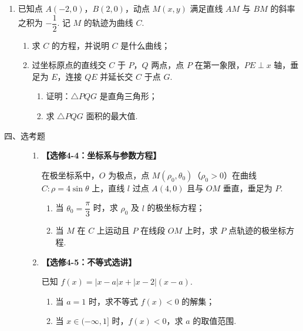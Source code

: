 \begin{description}
\begin{enumerate}[leftmargin=5pt]
        \item 已知点 \(A(-2,0)\)，\(B(2,0)\)，动点 \(M(x,y)\) 满足直线 \(AM\) 与 \(BM\) 的斜率之积为 \(-\dfrac12\). 记 \(M\) 的轨迹为曲线 \(C\).

\begin{enumerate}
\item 求 \(C\) 的方程，并说明 \(C\) 是什么曲线；
\item 过坐标原点的直线交 \(C\) 于 \(P\)，\(Q\) 两点，点 \(P\) 在第一象限，\(PE\perp x\) 轴，垂足为 \(E\)，连接 \(QE\) 并延长交 \(C\) 于点 \(G\).
\begin{enumerate}
\item 证明：\(\triangle PQG\) 是直角三角形；
\item 求 \(\triangle PQG\) 面积的最大值.
\end{enumerate}
\end{enumerate}

    \end{enumerate}

\end{description}

\begin{description}

    \item[四、选考题]

    \begin{enumerate}[leftmargin=5pt]

      \addtocounter{enumi}{+21}

        \item \textbf{【选修4-4：坐标系与参数方程】}

在极坐标系中，\(O\) 为极点，点 \(M(\rho_0,\theta_0)\)（\(\rho_0>0\)）在曲线 \(C:\rho=4\sin\theta\) 上，直线 \(l\) 过点 \(A(4,0)\) 且与 \(OM\) 垂直，垂足为 \(P\).

\begin{enumerate}
\item 当 \(\theta_0=\dfrac{\pi}{3}\) 时，求 \(\rho_0\) 及 \(l\) 的极坐标方程；
\item 当 \(M\) 在 \(C\) 上运动且 \(P\) 在线段 \(OM\) 上时，求 \(P\) 点轨迹的极坐标方程.
\end{enumerate}

        \item \textbf{【选修4-5：不等式选讲】}

已知 \(f(x)=|x-a|x+|x-2|(x-a)\).

\begin{enumerate}
\item 当 \(a=1\) 时，求不等式 \(f(x)<0\) 的解集；
\item 当 \(x\in(-\infty,1]\) 时，\(f(x)<0\)，求 \(a\) 的取值范围.
\end{enumerate}

    \end{enumerate}

\end{description}


